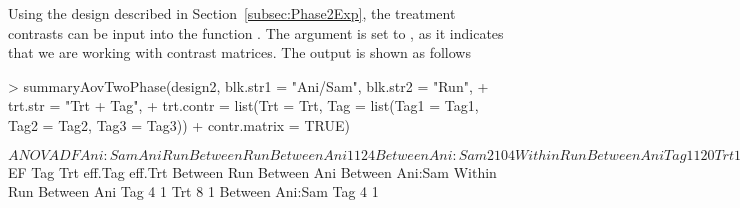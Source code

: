 \documentclass[article]{jss}
\begin{document}
Using the design described in Section~\ref{subsec:Phase2Exp}, the treatment contrasts can be input into the function . The argument  is set to , as it indicates that we are working with contrast matrices. The output is shown as follows
\begin{CodeChunk}
\begin{CodeInput}
> summaryAovTwoPhase(design2, blk.str1 = "Ani/Sam", blk.str2 = "Run", 
+ trt.str = "Trt + Tag", 
+ trt.contr = list(Trt = Trt, Tag = list(Tag1 = Tag1, Tag2 = Tag2, Tag3 = Tag3)) 
+ contr.matrix = TRUE)                               
\end{CodeInput}
\begin{CodeOutput}
$ANOVA
                   DF Ani:Sam Ani Run
Between Run                          
   Between Ani     1  1       2   4  
   Between Ani:Sam 2  1       0   4  
Within Run                              
   Between Ani                       
      Tag          1  1       2   0  
      Trt          1  1       2   0  
      Residual     4  1       2   0  
   Between Ani:Sam                   
      Tag          2  1       0   0  
      Residual     4  1       0   0  

$EF
                   Tag Trt eff.Tag eff.Trt
Between Run                               
   Between Ani                            
   Between Ani:Sam                        
Within Run                                   
   Between Ani                            
      Tag          4       1              
      Trt              8           1      
   Between Ani:Sam                        
      Tag          4       1              
\end{CodeOutput}
\end{CodeChunk}
\end{document}
